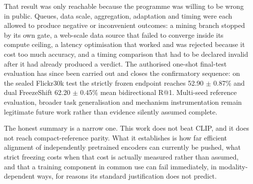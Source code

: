 That result was only reachable because the programme was willing to be wrong in public. Queues, data scale, aggregation, adaptation and timing were each allowed to produce negative or inconvenient outcomes: a mining branch stopped by its own gate, a web-scale data source that failed to converge inside its compute ceiling, a latency optimisation that worked and was rejected because it cost too much accuracy, and a timing comparison that had to be declared invalid after it had already produced a verdict. The authorised one-shot final-test evaluation has since been carried out and closes the confirmatory sequence: on the sealed Flickr30k test the strictly frozen endpoint reaches 52.90 $\pm$ 0.87\% and dual FreezeShift 62.20 $\pm$ 0.45\% mean bidirectional R@1. Multi-seed reference evaluation, broader task generalisation and mechanism instrumentation remain legitimate future work rather than evidence silently assumed complete.

The honest summary is a narrow one. This work does not beat CLIP, and it does not reach compact-reference parity. What it establishes is how far efficient alignment of independently pretrained encoders can currently be pushed, what strict freezing costs when that cost is actually measured rather than assumed, and that a training component in common use can fail immediately, in modality-dependent ways, for reasons its standard justification does not predict.

